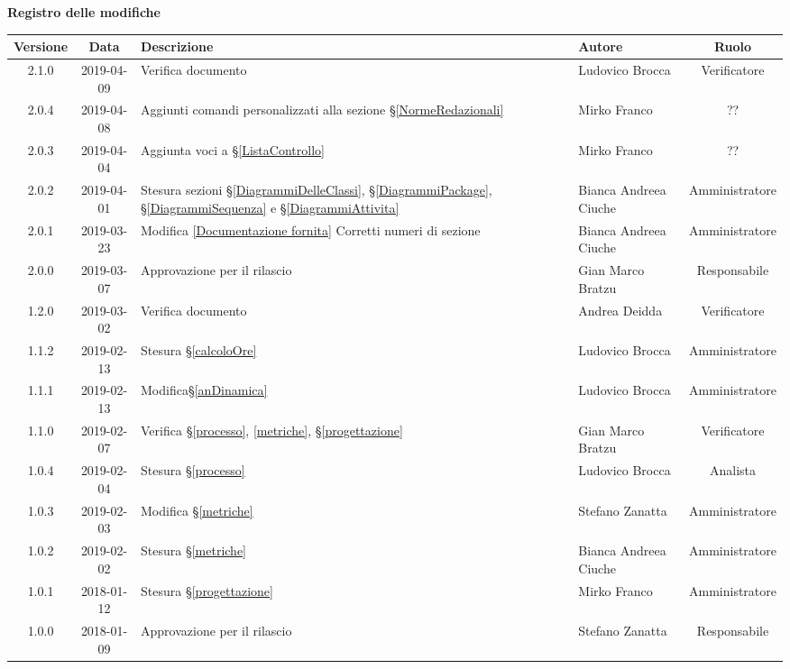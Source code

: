 \begin{center}
	\textbf{Registro delle modifiche}
	\end{center}
	\begin{center}
		\begin{tabularx}{\textwidth}{|c|c|X|X|c|}
			\hline
			\textbf{Versione} & \textbf{Data} & \textbf{Descrizione} & \textbf{Autore} & \textbf{Ruolo} \\ 
			\hline
			2.1.0 & 2019-04-09 & Verifica documento & Ludovico Brocca & Verificatore \\
			\hline
			2.0.4 & 2019-04-08 & Aggiunti comandi personalizzati alla sezione \S\ref{NormeRedazionali} & Mirko Franco & ?? \\
			\hline
			2.0.3 & 2019-04-04 & Aggiunta voci a \S\ref{ListaControllo} & Mirko Franco & ?? \\
			\hline
			2.0.2 & 2019-04-01 & Stesura sezioni \S\ref{DiagrammiDelleClassi}, \S\ref{DiagrammiPackage}, \S\ref{DiagrammiSequenza} e \S\ref{DiagrammiAttivita}  & Bianca Andreea Ciuche & Amministratore \\
			\hline
			2.0.1 & 2019-03-23 & Modifica \ref{Documentazione fornita} Corretti numeri di sezione & Bianca Andreea Ciuche & Amministratore \\
			\hline
			2.0.0 &2019-03-07 & Approvazione per il rilascio & Gian Marco Bratzu& Responsabile\\
			\hline
			1.2.0 &2019-03-02 & Verifica documento &Andrea Deidda& Verificatore\\
			\hline
			1.1.2 &2019-02-13 &Stesura \S\ref{calcoloOre} &Ludovico Brocca& Amministratore\\
			\hline
			1.1.1 &2019-02-13 &Modifica\S \ref{anDinamica} &Ludovico Brocca& Amministratore\\
			\hline
			1.1.0 &2019-02-07 &Verifica \S\ref{processo}, \ref{metriche}, \S\ref{progettazione} &Gian Marco Bratzu& Verificatore\\
			\hline
			1.0.4 &2019-02-04&Stesura \S\ref{processo}&Ludovico Brocca& Analista\\
			\hline
			1.0.3 & 2019-02-03 & Modifica \S\ref{metriche} & Stefano Zanatta & Amministratore\\
			\hline
			1.0.2 & 2019-02-02 & Stesura \S\ref{metriche} & Bianca Andreea Ciuche & Amministratore\\
			\hline
			1.0.1 & 2018-01-12 & Stesura \S\ref{progettazione} & Mirko Franco & Amministratore \\
			\hline
			1.0.0 & 2018-01-09 & Approvazione per il rilascio & Stefano Zanatta & Responsabile\\

\end{tabularx}
\end{center}
